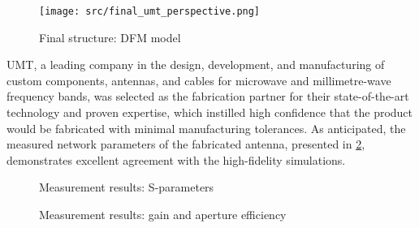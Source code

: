 \documentclass[11pt,a4paper,twoside,openany]{report}
\begin{document}
\begin{figure}[!ht]
    \centering
    \texttt{[image: src/final\_umt\_perspective.png]}
    \caption{\label{fig:final-umt-perspective}Final structure: DFM model}
\end{figure}
UMT, a leading company in the design, development, and manufacturing of custom components, antennas, and cables for microwave and millimetre-wave frequency bands, was selected as the fabrication partner for their state-of-the-art technology and proven expertise, which instilled high confidence that the product would be fabricated with minimal manufacturing tolerances. As anticipated, the measured network parameters of the fabricated antenna, presented in \cref{fig:meas-vs-sim-sparameters}, demonstrates excellent agreement with the high-fidelity simulations.

\begin{figure}[!ht]
    \centering
    
    \caption{\label{fig:meas-vs-sim-sparameters}Measurement results: S-parameters}
\end{figure}

\begin{figure}[!ht]
    \centering
    
    \caption{\label{fig:meas-vs-sim-gain-and-aperture-efficiency}Measurement results: gain and aperture efficiency}
\end{figure}
\end{document}
